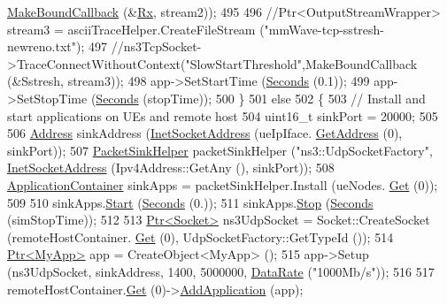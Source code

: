 \begin{DoxyCode}
      \hyperlink{group__makeboundcallback_ga1725d6362e6065faa0709f7c93f8d770}{MakeBoundCallback} (&\hyperlink{mmwave-tcp-building-example_8cc_a44926b91325d01c8749a8e4728a65087}{Rx}, stream2));
495 
496         \textcolor{comment}{//Ptr<OutputStreamWrapper> stream3 = asciiTraceHelper.CreateFileStream
       ("mmWave-tcp-sstresh-newreno.txt");}
497         \textcolor{comment}{//ns3TcpSocket->TraceConnectWithoutContext("SlowStartThreshold",MakeBoundCallback (&Sstresh,
       stream3));}
498         app->SetStartTime (\hyperlink{group__timecivil_ga33c34b816f8ff6628e33d5c8e9713b9e}{Seconds} (0.1));
499         app->SetStopTime (\hyperlink{group__timecivil_ga33c34b816f8ff6628e33d5c8e9713b9e}{Seconds} (stopTime));
500         \}
501         \textcolor{keywordflow}{else}
502         \{
503         \textcolor{comment}{// Install and start applications on UEs and remote host}
504         uint16\_t sinkPort = 20000;
505 
506         \hyperlink{classns3_1_1Address}{Address} sinkAddress (\hyperlink{classns3_1_1InetSocketAddress}{InetSocketAddress} (ueIpIface.
      \hyperlink{classns3_1_1Ipv4InterfaceContainer_ae63208dcd222be986822937ee4aa828c}{GetAddress} (0), sinkPort));
507         \hyperlink{classns3_1_1PacketSinkHelper}{PacketSinkHelper} packetSinkHelper (\textcolor{stringliteral}{"ns3::UdpSocketFactory"}, 
      \hyperlink{classns3_1_1InetSocketAddress}{InetSocketAddress} (Ipv4Address::GetAny (), sinkPort));
508         \hyperlink{classns3_1_1ApplicationContainer}{ApplicationContainer} sinkApps = packetSinkHelper.Install (ueNodes.
      \hyperlink{classns3_1_1NodeContainer_a9ed96e2ecc22e0f5a3d4842eb9bf90bf}{Get} (0));
509 
510         sinkApps.\hyperlink{classns3_1_1ApplicationContainer_a8eff87926507020bbe3e1390358a54a7}{Start} (\hyperlink{group__timecivil_ga33c34b816f8ff6628e33d5c8e9713b9e}{Seconds} (0.));
511         sinkApps.\hyperlink{classns3_1_1ApplicationContainer_adfc52f9aa4020c8714679b00bbb9ddb3}{Stop} (\hyperlink{group__timecivil_ga33c34b816f8ff6628e33d5c8e9713b9e}{Seconds} (simStopTime));
512 
513         \hyperlink{classns3_1_1Ptr}{Ptr<Socket>} ns3UdpSocket = Socket::CreateSocket (remoteHostContainer.
      \hyperlink{classns3_1_1NodeContainer_a9ed96e2ecc22e0f5a3d4842eb9bf90bf}{Get} (0), UdpSocketFactory::GetTypeId ());
514         \hyperlink{classns3_1_1Ptr}{Ptr<MyApp>} app = CreateObject<MyApp> ();
515         app->Setup (ns3UdpSocket, sinkAddress, 1400, 5000000, \hyperlink{classns3_1_1DataRate}{DataRate} (\textcolor{stringliteral}{"1000Mb/s"}));
516 
517         remoteHostContainer.\hyperlink{classns3_1_1NodeContainer_a9ed96e2ecc22e0f5a3d4842eb9bf90bf}{Get} (0)->\hyperlink{classns3_1_1Node_ab98b4fdc4aadc86366b80e8a79a53f47}{AddApplication} (app);

\end{DoxyCode}
